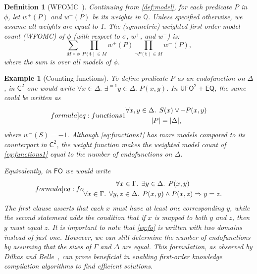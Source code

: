 \documentclass{article}
\newtheorem{definition}{Definition}
\newtheorem{example}{Example}
\theoremstyle{remark}
\newcommand{\Ctwo}{$\mathsf{C}^{2}$}
\newcommand{\FO}{$\mathsf{FO}$}
\newcommand{\UFO}{$\mathsf{UFO}^{2} + \mathsf{EQ}$}
\begin{document}
\begin{definition}[WFOMC~\cite{DBLP:conf/ijcai/BroeckTMDR11}]
  Continuing from \cref{def:model}, for each predicate $P$ in $\phi$, let
  $w^{+}(P)$ and $w^{-}(P)$ be its \emph{weights} in $\mathbb{Q}$. Unless
  specified otherwise, we assume all weights are equal to 1. The
  \emph{(symmetric) weighted first-order model count} (WFOMC) of $\phi$ (with
  respect to $\sigma$, $w^{+}$, and $w^{-}$) is:
  \[
    \sum_{M \models \phi} \prod_{P(\mathbf{t}) \in M} w^{+}(P) \prod_{\neg P(\mathbf{t}) \in M} w^{-}(P),
  \]
  where the sum is over all models of $\phi$.
\end{definition}

\begin{example}[Counting functions]\label{example:functions}
  To define predicate $P$ as an endofunction on $\Delta$, in \Ctwo{} one would
  write $\forall x \in \Delta\text{. }\exists^{=1} y \in \Delta\text{.
  }P(x, y)$. In \UFO{}, the same could be written as
  \begin{equation}\label[formula]{eq:functions1}
    \begin{gathered}
      \forall x, y \in \Delta\text{. }S(x) \lor \neg P(x, y)\\
      |P| = |\Delta|,
    \end{gathered}
  \end{equation}
  where $w^{-}(S) = -1$. Although \cref{eq:functions1} has more models compared
  to its counterpart in \Ctwo{}, the weight function makes the \emph{weighted}
  model count of \cref{eq:functions1} equal to the number of endofunctions on
  $\Delta$.

  Equivalently, in \FO{} we would write
  \begin{equation}\label[formula]{eq:fo}
    \begin{gathered}
      \forall x \in \Gamma\text{. }\exists y \in \Delta\text{. }P(x, y)\\
      \forall x \in \Gamma\text{. }\forall y, z \in \Delta\text{. }P(x, y) \land P(x, z) \Rightarrow y = z.
    \end{gathered}
  \end{equation}
  The first clause asserts that each $x$ must have at least one corresponding
  $y$, while the second statement adds the condition that if $x$ is mapped to
  both $y$ and $z$, then $y$ must equal $z$. It is important to note that
  \cref{eq:fo} is written with two domains instead of just one. However, we can
  still determine the number of endofunctions by assuming that the sizes of
  $\Gamma$ and $\Delta$ are equal. This formulation, as observed by Dilkas and
  Belle~, can prove beneficial in enabling
  first-order knowledge compilation algorithms to find efficient solutions.
\end{example}
\end{document}

